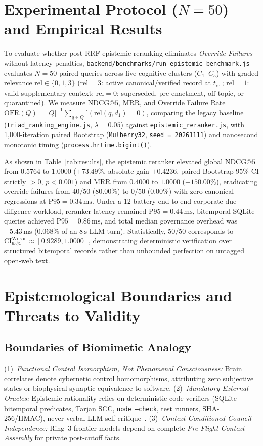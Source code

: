 \documentclass[10pt,twocolumn]{article}
\begin{document}
\section{Experimental Protocol ($N = 50$) and Empirical Results}

To evaluate whether post-RRF epistemic reranking eliminates \emph{Override Failures} without latency penalties, \texttt{backend/benchmarks/run\_epistemic\_benchmark.js} evaluates $N = 50$ paired queries across five cognitive clusters ($C_1$--$C_5$) with graded relevance $\mathrm{rel} \in \{0, 1, 3\}$ ($\mathrm{rel}=3$: active canonical/verified record at $t_{\mathrm{ref}}$; $\mathrm{rel}=1$: valid supplementary context; $\mathrm{rel}=0$: superseded, pre-enactment, off-topic, or quarantined). We measure $\mathrm{NDCG@5}$, $\mathrm{MRR}$, and Override Failure Rate $\mathrm{OFR}(Q) = |Q|^{-1}\sum_{q \in Q}\mathbb{I}(\mathrm{rel}(q,d_1)=0)$, comparing the legacy baseline (\texttt{triad\_ranking\_engine.js}, $\lambda = 0.05$) against \texttt{epistemic\_reranker.js}, with 1,000-iteration paired Bootstrap (\texttt{Mulberry32}, \texttt{seed = 20261111}) and nanosecond monotonic timing (\texttt{process.hrtime.bigint()}).

As shown in Table~\ref{tab:results}, the epistemic reranker elevated global $\mathrm{NDCG@5}$ from $0.5764$ to $1.0000$ ($+73.49\%$, absolute gain $+0.4236$, paired Bootstrap $95\%$ CI strictly $>0$, $p < 0.001$) and $\mathrm{MRR}$ from $0.4000$ to $1.0000$ ($+150.00\%$), eradicating override failures from $40/50$ ($80.00\%$) to $0/50$ ($0.00\%$) with zero canonical regressions at $\mathrm{P95} = 0.34\,\mathrm{ms}$. Under a 12-battery end-to-end corporate due-diligence workload, reranker latency remained $\mathrm{P95} = 0.44\,\mathrm{ms}$, bitemporal SQLite queries achieved $\mathrm{P95} = 0.86\,\mathrm{ms}$, and total median governance overhead was $+5.43\,\mathrm{ms}$ ($0.068\%$ of an $8\,\mathrm{s}$ LLM turn). Statistically, $50/50$ corresponds to $\mathrm{CI}_{95\%}^{\mathrm{Wilson}} \approx [0.9289, 1.0000]$, demonstrating deterministic verification over structured bitemporal records rather than unbounded perfection on untagged open-web text.

\section{Epistemological Boundaries and Threats to Validity}

\subsection{Boundaries of Biomimetic Analogy}
(1)~\emph{Functional Control Isomorphism, Not Phenomenal Consciousness:} Brain correlates denote cybernetic control homomorphisms, attributing zero subjective states or biophysical synaptic equivalence to software. (2)~\emph{Mandatory External Oracles:} Epistemic rationality relies on deterministic code verifiers (SQLite bitemporal predicates, Tarjan SCC, \texttt{node --check}, test runners, SHA-256/HMAC), never verbal LLM self-critique~\cite{E28}. (3)~\emph{Context-Conditioned Council Independence:} Ring~3 frontier models depend on complete \emph{Pre-Flight Context Assembly} for private post-cutoff facts.
\end{document}
